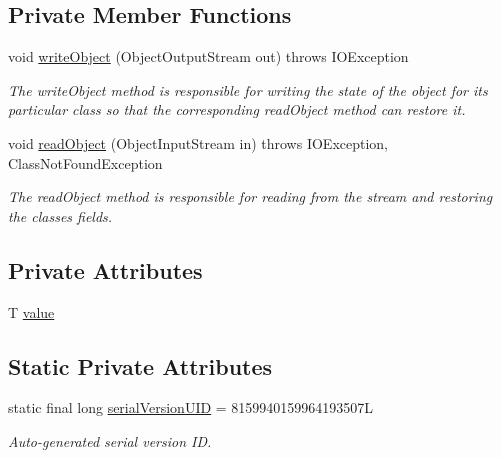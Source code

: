 \subsection*{Private Member Functions}
\begin{DoxyCompactItemize}
\item 
void \mbox{\hyperlink{classcom_1_1fermod_1_1observer_1_1ObservedValue_ae1d53d3762867c30fb44fdfdfa320d8c}{write\+Object}} (Object\+Output\+Stream out)  throws I\+O\+Exception 
\begin{DoxyCompactList}\small\item\em The {\ttfamily write\+Object} method is responsible for writing the state of the object for its particular class so that the corresponding {\ttfamily read\+Object} method can restore it. \end{DoxyCompactList}\item 
void \mbox{\hyperlink{classcom_1_1fermod_1_1observer_1_1ObservedValue_afa9726a00fec7f70867cd34604a49842}{read\+Object}} (Object\+Input\+Stream in)  throws I\+O\+Exception, Class\+Not\+Found\+Exception 
\begin{DoxyCompactList}\small\item\em The {\ttfamily read\+Object} method is responsible for reading from the stream and restoring the classes fields. \end{DoxyCompactList}\end{DoxyCompactItemize}
\subsection*{Private Attributes}
\begin{DoxyCompactItemize}
\item 
T \mbox{\hyperlink{classcom_1_1fermod_1_1observer_1_1ObservedValue_a947edfec1982817155067f495b0c8cf7}{value}}
\end{DoxyCompactItemize}
\subsection*{Static Private Attributes}
\begin{DoxyCompactItemize}
\item 
static final long \mbox{\hyperlink{classcom_1_1fermod_1_1observer_1_1ObservedValue_ad494135b9a0d52423069327f49e93937}{serial\+Version\+U\+ID}} = 8159940159964193507L
\begin{DoxyCompactList}\small\item\em Auto-\/generated serial version ID. \end{DoxyCompactList}\end{DoxyCompactItemize}
